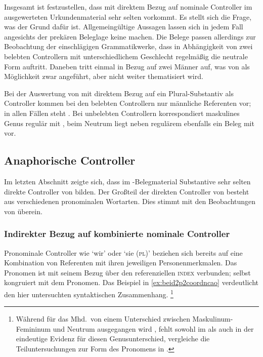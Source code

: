 Insgesamt ist festzustellen, dass  mit direktem Bezug auf
nominale Controller im ausgewerteten Urkundenmaterial sehr selten vorkommt. Es
stellt sich die Frage, was der Grund dafür ist. Allgemeingültige Aussagen
lassen sich in jedem Fall angesichts der prekären Beleglage keine machen. Die
Belege passen allerdings zur Beobachtung der einschlägigen Grammatikwerke, dass
in Abhängigkeit von zwei belebten Controllern mit unterschiedlichem Geschlecht
regelmäßig die neutrale Form  auftritt. Daneben tritt
 einmal in Bezug auf zwei Männer auf, was von
\textcite[384]{paul2007} als Möglichkeit zwar angeführt, aber nicht weiter
thematisiert wird.

Bei der Auswertung von  mit direktem Bezug auf ein
Plural-Substantiv als Controller kommen bei den belebten Controllern nur
männliche Referenten vor; in allen Fällen steht . Bei unbelebten
Controllern korrespondiert maskulines Genus regulär mit , beim
Neutrum liegt neben regulärem  ebenfalls ein Beleg mit
 vor.

\subsection{Anaphorische Controller}
\label{subsec:refctrl}

Im letzten Abschnitt zeigte sich, dass im \CAO{}-Belegmaterial
Substantive sehr selten direkte Controller von  bilden. Der
Großteil der direkten Controller von  besteht aus verschiedenen
pronominalen Wortarten.
Dies stimmt mit den Beobachtungen von \citet[624--625]{ksw2} überein.

\subsubsection{Indirekter Bezug auf kombinierte nominale Controller}
\label{subsubsec:beid2p2coordncao}

Pronominale Controller wie `wir' oder `sie (\textsc{pl})' beziehen sich
bereits auf eine Kombination von Referenten mit ihren jeweiligen
Personenmerkmalen. Das Pronomen ist mit seinem Bezug über den referenziellen
\textsc{index} verbunden;  selbst kongruiert mit dem Pronomen. Das
Beispiel in \cref{ex:beid2p2coordncao} verdeutlicht den hier untersuchten
syntaktischen Zusammenhang.%
%
	\footnote{Während für das  Mhd.\ von einem Unterschied
		zwischen Maskulinum-Femininum  und Neutrum 
		ausgegangen wird \autocites[vgl.][213--214]{paul2007}[369,
		390--397]{ksw2}, fehlt sowohl im \CAO{} als auch in der
		\KC{} eindeutige Evidenz für diesen Genusunterschied, vergleiche
		die Teiluntersuchungen zur Form des Pronomens in
		.}

